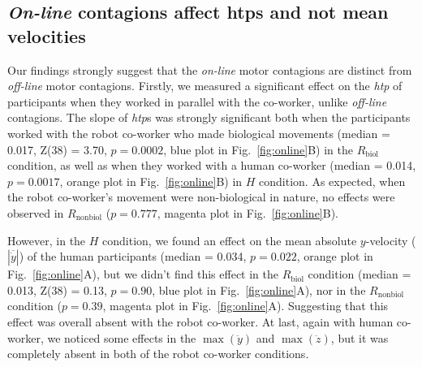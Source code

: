 \subsection{\textit{On-line} contagions affect htps and not mean velocities}

Our findings strongly suggest that the \textit{on-line} motor contagions are distinct from \textit{off-line} motor contagions. Firstly, we measured a significant effect on the {\it htp} of participants when they worked in parallel with the co-worker, unlike \textit{off-line} contagions. The slope of {\it htp}s was strongly significant both when the participants worked with the robot co-worker who made biological movements (median = 0.017, Z(38) = 3.70, $p = 0.0002$, blue plot in Fig.~\ref{fig:online}B) in the $R_{\text{biol}}$ condition, as well as when they worked with a human co-worker (median = 0.014, $p = 0.0017$, orange plot in Fig.~\ref{fig:online}B) in $H$ condition. As expected, when the robot co-worker's movement were non-biological in nature, no effects were observed in $R_{\text{nonbiol}}$ ($p = 0.777$, magenta plot in Fig.~\ref{fig:online}B).
 
However, in the $H$ condition, we found an effect on the mean absolute $y$-velocity ($|\overline{\dot{y}}|$) of the human participants (median = 0.034, $p = 0.022$, orange plot in Fig.~\ref{fig:online}A), but we didn't find this effect in the $R_{\text{biol}}$ condition (median = 0.013, Z(38) = 0.13, $p = 0.90$, blue plot in Fig.~\ref{fig:online}A), nor in the $R_{\text{nonbiol}}$ condition ($p = 0.39$, magenta plot in Fig.~\ref{fig:online}A). Suggesting that this effect was overall absent with the robot co-worker. At last, again with human co-worker, we noticed some effects in the $\max(\ddot{y})$ and $\max(\ddot{z})$, but it was completely absent in both of the robot co-worker conditions.


